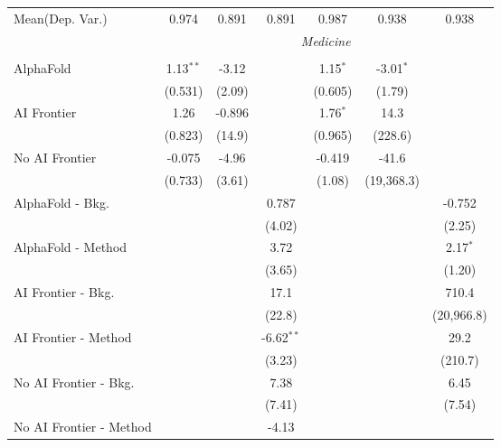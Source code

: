 \begin{tabular}{lcccccc}
Mean(Dep. Var.) & 0.974 & 0.891 & 0.891 & 0.987 & 0.938 & 0.938 \\
 & \multicolumn{6}{c}{\textit{Medicine}} \\ \\
   AlphaFold               & 1.13$^{**}$ & -3.12  &              & 1.15$^{*}$ & -3.01$^{*}$ &   \\   
                           & (0.531)     & (2.09) &              & (0.605)    & (1.79)      &   \\   
   AI Frontier             & 1.26        & -0.896 &              & 1.76$^{*}$ & 14.3        &   \\   
                           & (0.823)     & (14.9) &              & (0.965)    & (228.6)     &   \\   
   No AI Frontier          & -0.075      & -4.96  &              & -0.419     & -41.6       &   \\   
                           & (0.733)     & (3.61) &              & (1.08)     & (19,368.3)  &   \\   
   AlphaFold - Bkg.        &             &        & 0.787        &            &             & -0.752\\   
                           &             &        & (4.02)       &            &             & (2.25)\\   
   AlphaFold - Method      &             &        & 3.72         &            &             & 2.17$^{*}$\\   
                           &             &        & (3.65)       &            &             & (1.20)\\   
   AI Frontier - Bkg.      &             &        & 17.1         &            &             & 710.4\\   
                           &             &        & (22.8)       &            &             & (20,966.8)\\   
   AI Frontier - Method    &             &        & -6.62$^{**}$ &            &             & 29.2\\   
                           &             &        & (3.23)       &            &             & (210.7)\\   
   No AI Frontier - Bkg.   &             &        & 7.38         &            &             & 6.45\\   
                           &             &        & (7.41)       &            &             & (7.54)\\   
   No AI Frontier - Method &             &        & -4.13        &            &             &   \\   

\end{tabular}
